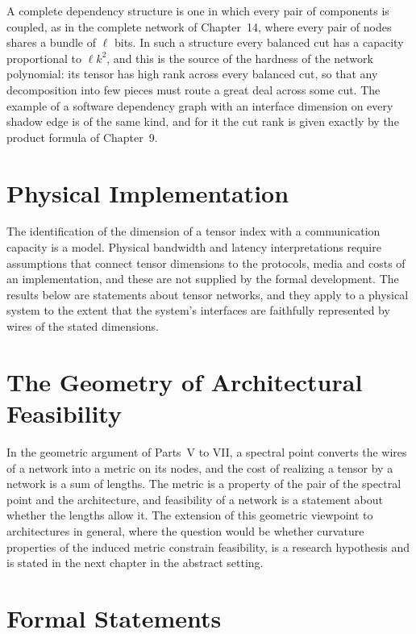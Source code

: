 \documentclass[11pt,letterpaper]{report}
\theoremstyle{plain}
\theoremstyle{definition}
\theoremstyle{remark}
\begin{document}
A complete dependency structure is one in which every pair of components is coupled, as in the complete network of Chapter~14, where every pair of nodes shares a bundle of $\ell$ bits. In such a structure every balanced cut has a capacity proportional to $\ell k^2$, and this is the source of the hardness of the network polynomial: its tensor has high rank across every balanced cut, so that any decomposition into few pieces must route a great deal across some cut. The example of a software dependency graph with an interface dimension on every shadow edge is of the same kind, and for it the cut rank is given exactly by the product formula of Chapter~9.

\section{Physical Implementation}

The identification of the dimension of a tensor index with a communication capacity is a model. Physical bandwidth and latency interpretations require assumptions that connect tensor dimensions to the protocols, media and costs of an implementation, and these are not supplied by the formal development. The results below are statements about tensor networks, and they apply to a physical system to the extent that the system's interfaces are faithfully represented by wires of the stated dimensions.

\section{The Geometry of Architectural Feasibility}

In the geometric argument of Parts~V to VII, a spectral point converts the wires of a network into a metric on its nodes, and the cost of realizing a tensor by a network is a sum of lengths. The metric is a property of the pair of the spectral point and the architecture, and feasibility of a network is a statement about whether the lengths allow it. The extension of this geometric viewpoint to architectures in general, where the question would be whether curvature properties of the induced metric constrain feasibility, is a research hypothesis and is stated in the next chapter in the abstract setting.

\section{Formal Statements}
\end{document}

